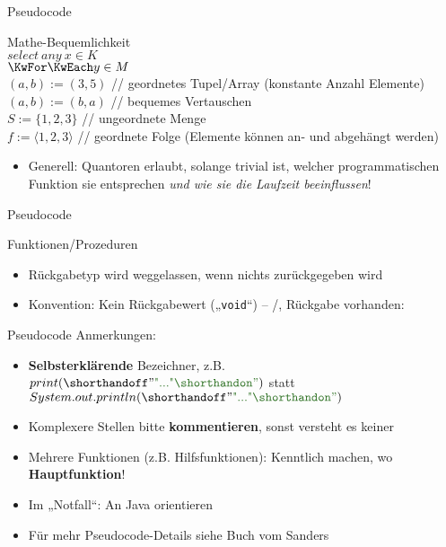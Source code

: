 \begin{frame}{Pseudocode}
	\begin{exampleblock}{Mathe-Bequemlichkeit}
		 \\[0,125cm]
		$select\ any\ x \in K$ \\[0,125cm]
		$\KwFor \KwEach y \in M$ \\[0,125cm]
		$(a, b) := (3, 5)$ // geordnetes Tupel/Array (konstante Anzahl Elemente) \\[0,125cm] %
		$(a, b) := (b, a)$ // bequemes Vertauschen \\[0,125cm]
		$S := \{1, 2, 3\}$ // ungeordnete Menge \\[0,125cm]
		$f := \langle1, 2, 3\rangle$ // geordnete Folge (Elemente können an- und abgehängt werden)
	\end{exampleblock}
	\begin{itemize}
		\item Generell: Quantoren erlaubt, solange trivial ist, welcher programmatischen Funktion sie entsprechen \textit{und wie sie die Laufzeit beeinflussen}!
	\end{itemize}
\end{frame}

\begin{frame}{Pseudocode}
	\begin{exampleblock}{Funktionen/Prozeduren}
		\begin{algorithm}[H]
			\DontPrintSemicolon
		\end{algorithm}
	\end{exampleblock}
	\begin{itemize}
		\item Rückgabetyp wird weggelassen, wenn nichts zurückgegeben wird
		\item Konvention: Kein Rückgabewert („\texttt{void}“) – \KwProcedure/\KwMethod, Rückgabe vorhanden: \KwFunction
	\end{itemize}
\end{frame}


\begin{frame}{Pseudocode}
	Anmerkungen: \\
	\begin{itemize}
		\pause
		\item \textbf{Selbsterklärende} Bezeichner, z.B. $print(\str{...})$ statt $System.out.println(\str{...})$
		\pause
		\item Komplexere Stellen bitte \textbf{kommentieren}, sonst versteht es keiner
		\pause
		\item Mehrere Funktionen (z.B. Hilfsfunktionen): Kenntlich machen, wo \textbf{Hauptfunktion}!
		\pause
		\item Im „Notfall“: An Java orientieren
		\pause
		\item Für mehr Pseudocode-Details siehe Buch vom Sanders
	\end{itemize}
\end{frame}


